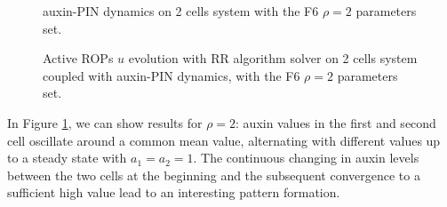 \begin{figure}[H]
    \centering
    \quad
    \caption[auxinPIN - with the F6 $\rho = 2$ set]{auxin-PIN dynamics on 2 cells system with the F6 $\rho = 2$ parameters set.}
    \label{fig:Uaux_F62}
\end{figure}
\begin{figure}[H]
    \centering
    \quad
    \quad
    \quad
    \quad
    \quad
    \quad
    \quad
    \quad
    \caption[2cell RR Active ROPs coupled auxin-PIN - with the F6 $\rho = 2$ set]{Active ROPs $u$ evolution with RR algorithm solver on 2 cells system coupled with auxin-PIN dynamics, with the F6 $\rho = 2$ parameters set.}
    \label{fig:U_F62}
\end{figure}

In Figure \ref{fig:Uaux_F62}, we can show results for $\rho = 2$: auxin values in the first and second cell oscillate around a common mean value, alternating with different values up to a steady state with $a_1 = a_2 = 1$. The continuous changing in auxin levels between the two cells at the beginning and the subsequent convergence to a sufficient high value lead to an interesting pattern formation.


